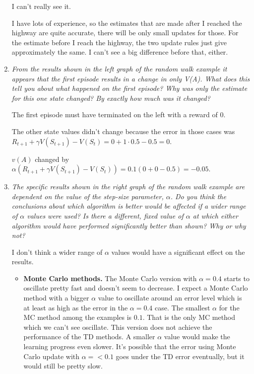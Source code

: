 \documentclass[12pt,a4paper]{article}
\begin{document}
\begin{enumerate}
I can't really see it.

I have lots of experience, so the estimates that are made after I reached
the highway are quite accurate, there will be only small updates for those.
For the estimate before I reach the highway, the two update rules just give
approximately the same. I can't see a big difference before that, either.

\item
\textit{From the results shown in the left graph of the random walk example it
appears that the first episode results in a change in only V(A). What does this tell you
about what happened on the first episode? Why was only the estimate for this one state
changed? By exactly how much was it changed?}

The first episode must have terminated on the left with a reward of $0$.

The other state values didn't change because the error in those cases was\\
$R_{t + 1} + \gamma V(S_{t + 1}) - V(S_t) = 0 + 1 \cdot 0.5 - 0.5 = 0$.

$v(A)$ changed by $\alpha (R_{t + 1} + \gamma V(S_{t + 1}) - V(S_t)) = 0.1 (0 + 0 - 0.5) = -0.05$.

\item
\textit{The specific results shown in the right graph of the random walk example
are dependent on the value of the step-size parameter, $\alpha$. Do you think the conclusions
about which algorithm is better would be affected if a wider range of $\alpha$ values were used?
Is there a different, fixed value of $\alpha$ at which either algorithm would have performed
significantly better than shown? Why or why not?}

I don't think a wider range of $\alpha$ values would have a significant effect on the results.

\begin{itemize}
\item \textbf{Monte Carlo methods.}
The Monte Carlo version with $\alpha = 0.4$ starts to oscillate pretty fast and doesn't
seem to decrease. I expect a Monte Carlo method with a bigger $\alpha$ value to oscillate
around an error level which is at least as high as the error in the $\alpha = 0.4$
case. The smallest $\alpha$ for the MC method among the examples is $0.1$. That is
the only MC method which we can't see oscillate. This version does not achieve the
performance of the TD methods. A smaller $\alpha$ value would make the learning progress
even slower. It's possible that the error using Monte Carlo update with $\alpha =<0.1$
goes under the TD error eventually, but it would still be pretty slow.


\end{itemize}
\end{enumerate}
\end{document}
